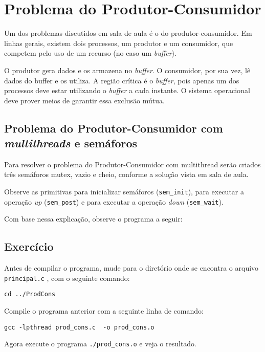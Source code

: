 \chapter{Problema do Produtor-Consumidor}
Um dos problemas discutidos em sala de aula é o do produtor-consumidor. Em linhas gerais, existem dois processos, um produtor e um consumidor, que competem pelo uso de um recurso (no caso um \textit{buffer}).

O produtor gera dados e os armazena no \textit{buffer}. O consumidor, por sua vez, lê dados do buffer e os utiliza. A região crítica é o \textit{buffer}, pois apenas um dos processos deve estar utilizando o \textit{buffer} a cada instante. O sistema operacional deve prover meios de garantir essa exclusão mútua.


\section{Problema do Produtor-Consumidor com \textit{multithreads} e semáforos}
Para resolver o problema do Produtor-Consumidor com multithread serão criados três semáforos mutex, vazio e cheio, conforme a solução vista em sala de aula.

Observe as primitivas para inicializar semáforos (\texttt{sem\_init}), para executar a operação \textit{up} (\texttt{sem\_post}) e para executar a operação \textit{down} (\texttt{sem\_wait}).

Com base nessa explicação, observe o programa a seguir: 


\section{Exercício}
Antes de compilar o programa, mude para o diretório onde se encontra o arquivo \texttt{principal.c} , com o seguinte comando:

\begin{lstlisting}[style=MyBashStyle]
cd ../ProdCons
\end{lstlisting}

Compile o programa anterior com a seguinte linha de comando:

\begin{lstlisting}[style=MyBashStyle]
gcc -lpthread prod_cons.c  -o prod_cons.o
\end{lstlisting}

Agora execute o programa \texttt{./prod\_cons.o} e veja o resultado.
